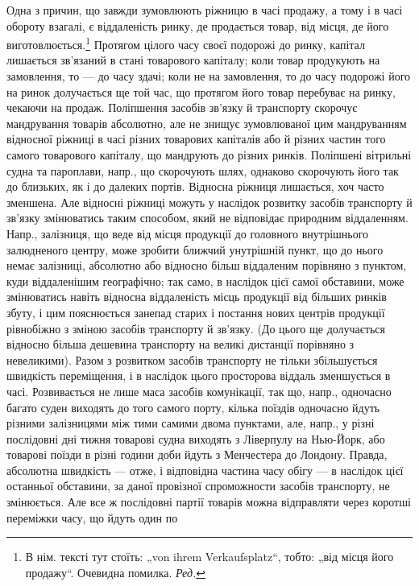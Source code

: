 Одна з причин, що завжди зумовлюють ріжницю в часі продажу, а
тому і в часі обороту взагалі, є віддаленість ринку, де продається товар,
від місця, де його виготовлюється.\footnote*{
В нім. тексті тут стоїть: „von ihrem Verkaufsplatz“, тобто: „від місця його продажу“.
Очевидна помилка. \emph{Ред.}
} Протягом цілого часу своєї подорожі
до ринку, капітал лишається зв’язаний в стані товарового капіталу;
коли товар продукують на замовлення, то — до часу здачі; коли не на замовлення,
то до часу подорожі його на ринок долучається ще той час,
що протягом його товар перебуває на ринку, чекаючи на продаж. Поліпшення
засобів зв’язку й транспорту скорочує мандрування товарів абсолютно,
але не знищує зумовлюваної цим мандруванням відносної ріжниці
в часі різних товарових капіталів або й різних частин того самого товарового
капіталу, що мандрують до різних ринків. Поліпшені вітрильні
судна та пароплави, напр., що скорочують шлях, однаково скорочують
його так до близьких, як і до далеких портів. Відносна ріжниця лишається,
хоч часто зменшена. Але відносні ріжниці можуть у наслідок розвитку
засобів транспорту й зв’язку змінюватись таким способом, який не відповідає
природним віддаленням. Напр., залізниця, що веде від місця продукції до
головного внутрішнього залюдненого центру, може зробити ближчий
унутрішній пункт, що до нього немає залізниці, абсолютно або відносно
більш віддаленим порівняно з пунктом, куди віддаленішим географічно; так
само, в наслідок цієї самої обставини, може змінюватись навіть відносна
віддаленість місць продукції від більших ринків збуту, і цим пояснюється
занепад старих і постання нових центрів продукції рівнобіжно з зміною
засобів транспорту й зв’язку. (До цього ще долучається відносно більша
дешевина транспорту на великі дистанції порівняно з невеликими). Разом
з розвитком засобів транспорту не тільки збільшується швидкість
переміщення, і в наслідок цього просторова віддаль зменшується в часі.
Розвивається не лише маса засобів комунікації, так що, напр., одночасно
багато суден виходять до того самого порту, кілька поїздів одночасно
йдуть різними залізницями між тими самими двома пунктами, але, напр.,
у різні послідовні дні тижня товарові судна виходять з Ліверпулу на
Нью-Йорк, або товарові поїзди в різні години доби йдуть з Менчестера
до Лондону. Правда, абсолютна швидкість — отже, і відповідна частина
часу обігу — в наслідок цієї останньої обставини, за даної провізної спроможности
засобів транспорту, не змінюється. Але все ж послідовні партії товарів
можна відправляти через коротші переміжки часу, що йдуть один по
